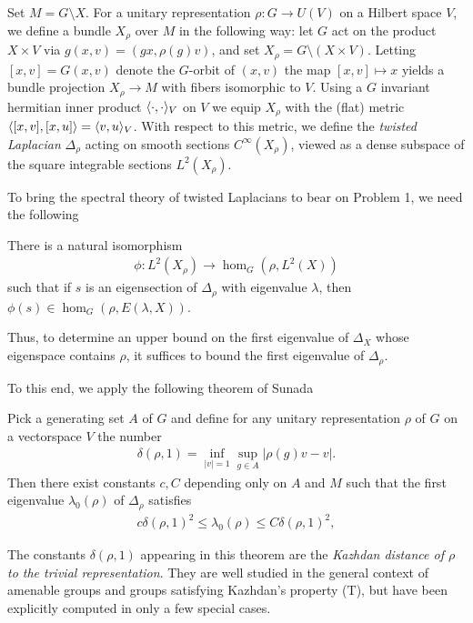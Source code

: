 \documentclass[11pt]{article}
\newcommand{\lmod}{\setminus}
\begin{document}
Set $M=G\lmod X$. For a unitary representation $\rho:G\to U(V)$ on a Hilbert space $V$, we define a bundle $X_\rho$ over $M$ in the following way: let $G$ act on the product $X\times V$ via $g(x,v)=(gx,\rho(g)v)$, and set $X_\rho=G\lmod (X\times V)$. Letting $[x,v]=G(x,v)$ denote the $G$-orbit of $(x,v)$ the map $[x,v]\mapsto x$ yields a bundle projection $X_\rho \to M$ with fibers isomorphic to $V$. Using a $G$ invariant hermitian inner product $\langle \cdot, \cdot \rangle_V$ on $V$ we equip $X_\rho$ with the (flat) metric $\langle [x,v], [x,u] \rangle=\langle v, u \rangle_V$. With respect to this metric, we define the \emph{twisted Laplacian} $\Delta_\rho$ acting on smooth sections $C^\infty(X_\rho)$, viewed as a dense subspace of the square integrable sections $L^2(X_\rho)$.

To bring the spectral theory of twisted Laplacians to bear on Problem 1, we need the following \cite{Heintze1978}
\begin{lemma}
	There is a natural isomorphism 
	\begin{align*}
		\phi: L^2(X_\rho) \to \hom_G(\rho,L^2(X))
	\end{align*}
	such that if $s$ is an eigensection of $\Delta_\rho$ with eigenvalue $\lambda$, then $\phi(s) \in \hom_G(\rho,E(\lambda, X))$.
\end{lemma} 
Thus, to determine an upper bound on the first eigenvalue of $\Delta_X$ whose eigenspace contains $\rho$, it suffices to bound the first eigenvalue of $\Delta_\rho$.

To this end, we apply the following theorem of Sunada \cite{sunada1989}
\begin{thm}
	Pick a generating set $A$ of $G$ and define for any unitary representation $\rho$ of $G$ on a vectorspace $V$ the number
	\begin{align*}
		\delta(\rho,1)=\inf_{|v|=1} \sup _{g\in A} |\rho(g)v-v|.
	\end{align*} Then there exist constants $c,C$ depending only on $A$ and $M$ such that the first eigenvalue $\lambda_0(\rho)$ of $\Delta_\rho$ satisfies
		\begin{align*}
			c \delta(\rho,1)^2\leq \lambda_0(\rho)\leq C\delta(\rho,1)^2, 
		\end{align*} 
\end{thm}
The constants $\delta(\rho,1)$ appearing in this theorem are the \emph{Kazhdan distance 
	of $\rho$ to the trivial representation}. They are well studied in the general context of amenable groups and groups satisfying Kazhdan's property (T), but have been explicitly computed in only a few special cases. 
\end{document}
